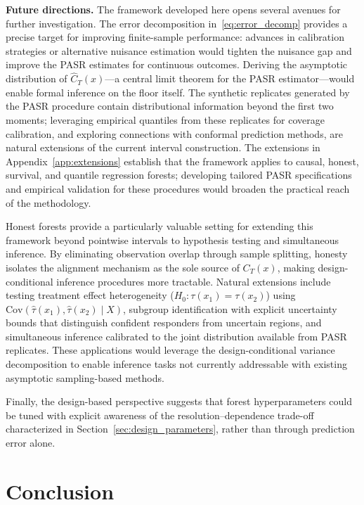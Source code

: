 \documentclass[11pt]{article}
\theoremstyle{plain}
\theoremstyle{definition}
\theoremstyle{remark}
\begin{document}
\medskip
\noindent\textbf{Future directions.}
The framework developed here opens several avenues for further investigation. The error decomposition in~\eqref{eq:error_decomp} provides a precise target for improving finite-sample performance: advances in calibration strategies or alternative nuisance estimation would tighten the nuisance gap and improve the PASR estimates for continuous outcomes. Deriving the asymptotic distribution of $\widehat{C}_T(x)$---a central limit theorem for the PASR estimator---would enable formal inference on the floor itself. The synthetic replicates generated by the PASR procedure contain distributional information beyond the first two moments; leveraging empirical quantiles from these replicates for coverage calibration, and exploring connections with conformal prediction methods, are natural extensions of the current interval construction. The extensions in Appendix~\ref{app:extensions} establish that the framework applies to causal, honest, survival, and quantile regression forests; developing tailored PASR specifications and empirical validation for these procedures would broaden the practical reach of the methodology. 

Honest forests provide a particularly valuable setting for extending this framework beyond pointwise intervals to hypothesis testing and simultaneous inference. By eliminating observation overlap through sample splitting, honesty isolates the alignment mechanism as the sole source of $C_T(x)$, making design-conditional inference procedures more tractable. Natural extensions include testing treatment effect heterogeneity ($H_0: \tau(x_1) = \tau(x_2)$) using $\text{Cov}(\hat{\tau}(x_1), \hat{\tau}(x_2) \mid X)$, subgroup identification with explicit uncertainty bounds that distinguish confident responders from uncertain regions, and simultaneous inference calibrated to the joint distribution available from PASR replicates. These applications would leverage the design-conditional variance decomposition to enable inference tasks not currently addressable with existing asymptotic sampling-based methods.

Finally, the design-based perspective suggests that forest hyperparameters could be tuned with explicit awareness of the resolution--dependence trade-off characterized in Section~\ref{sec:design_parameters}, rather than through prediction error alone.

\section{Conclusion}
\label{sec:conclusion}
\end{document}
